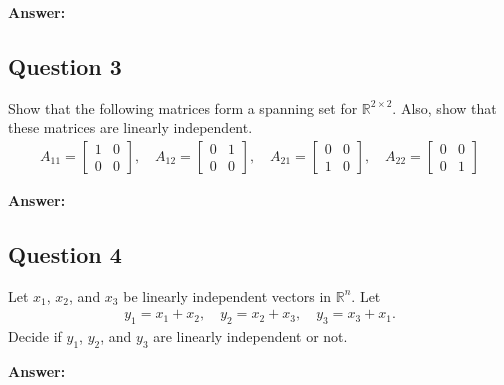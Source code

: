 \documentclass{article}
\begin{document}
\textbf{Answer:} 


\subsection*{Question 3}
Show that the following matrices form a spanning set for \(\mathbb{R}^{2 \times 2}\). Also, show that these matrices are linearly independent.
\begin{align*}
A_{11} = \begin{bmatrix} 1 & 0 \\ 0 & 0 \end{bmatrix}, \quad
A_{12} = \begin{bmatrix} 0 & 1 \\ 0 & 0 \end{bmatrix}, \quad
A_{21} = \begin{bmatrix} 0 & 0 \\ 1 & 0 \end{bmatrix}, \quad
A_{22} = \begin{bmatrix} 0 & 0 \\ 0 & 1 \end{bmatrix}
\end{align*}

\textbf{Answer:} 


\subsection*{Question 4}
Let \(x_{1}\), \(x_{2}\), and \(x_{3}\) be linearly independent vectors in \(\mathbb{R}^{n}\). Let
\begin{align*}
y_{1} = x_{1} + x_{2}, \quad y_{2} = x_{2} + x_{3}, \quad y_{3} = x_{3} + x_{1}.
\end{align*}
Decide if \(y_{1}\), \(y_{2}\), and \(y_{3}\) are linearly independent or not.

\textbf{Answer:} 
\end{document}
